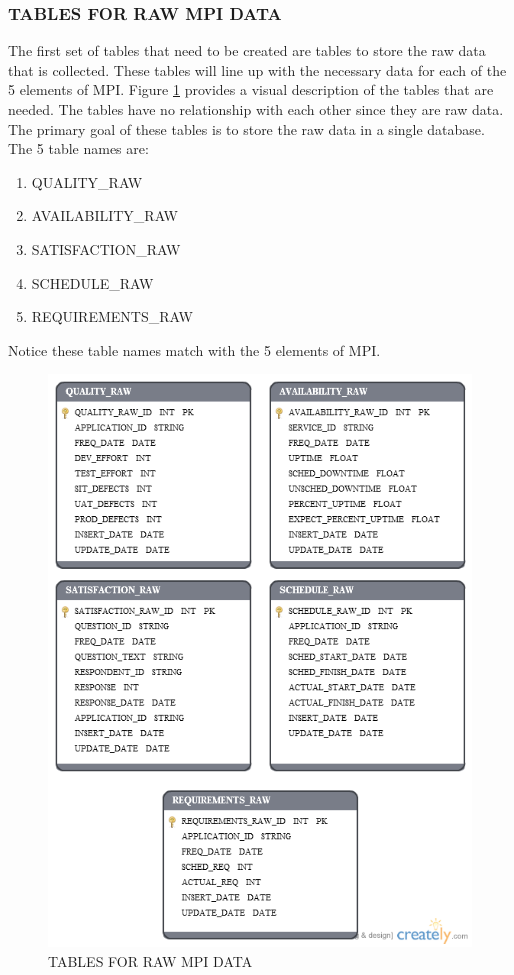\documentclass[SDSUThesis.tex]{subfiles}
\begin{document}
   \subsubsection{TABLES FOR RAW MPI DATA}
   
        The first set of tables that need to be created are tables
        to store the raw data that is collected.  These tables
        will line up with the necessary data for each of the 5 elements
        of MPI.  Figure \ref{fig:raw} provides a visual description
        of the tables that are needed.  The tables have no relationship
        with each other since they are raw data.  The primary goal of
        these tables is to store the raw data in a single database. The
        5 table names are:
        \begin{enumerate}
            \item QUALITY\_RAW
            \item AVAILABILITY\_RAW
            \item SATISFACTION\_RAW
            \item SCHEDULE\_RAW
            \item REQUIREMENTS\_RAW
        \end{enumerate}
        Notice these table names match with the 5 elements of MPI.
   
       \begin{figure}[ht]
            \centering
            \includegraphics[scale=.55]{images/raw_tables.png}
            \caption{TABLES FOR RAW MPI DATA}
            \label{fig:raw}
        \end{figure}%
        
\end{document}
